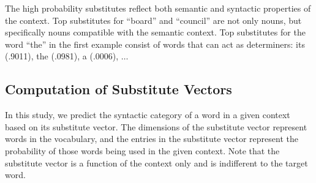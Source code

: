 The high probability substitutes reflect both semantic and syntactic
properties of the context.  Top substitutes for ``board'' and
``council'' are not only nouns, but specifically nouns compatible with
the semantic context.  Top substitutes for the word ``the'' in the
first example consist of words that can act as determiners: its
(.9011), the (.0981), a (.0006), $\ldots$



\subsection{Computation of Substitute Vectors}
\label{sec:subcomp}

In this study, we predict the syntactic category of a word in a given
context based on its substitute vector.  The dimensions of the
substitute vector represent words in the vocabulary, and the entries
in the substitute vector represent the probability of those words
being used in the given context.  Note that the substitute vector is a
function of the context only and is indifferent to the target word.



